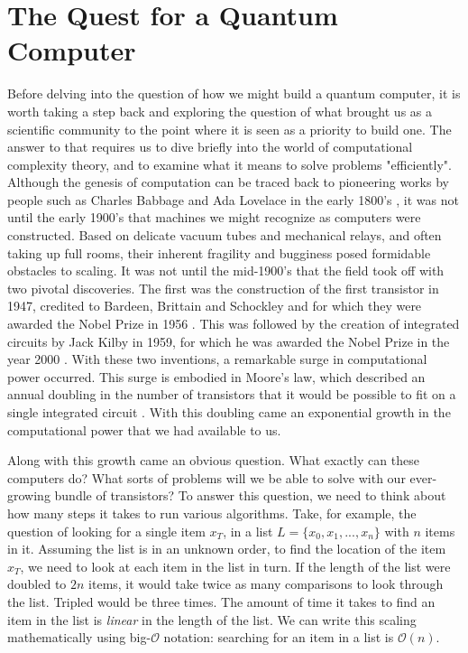 \chapter{The Quest for a Quantum Computer}
\label{sec:quest}
Before delving into the question of how we might build a quantum computer, it is worth taking a step
back and exploring the question of what brought us as a scientific community to the point where
it is seen as a priority to build one. The answer to that requires us to dive briefly into
the world of computational complexity theory, and to examine what it means to solve problems "efficiently".
Although the genesis of computation can be traced back to pioneering works by people such as Charles Babbage
and Ada Lovelace in the early 1800's \cite{Bowden:1953:FTS:1102044}, it was not until the early 1900's that
machines we might recognize as computers were constructed. Based on delicate vacuum tubes and mechanical relays,
and often taking up full rooms, their inherent fragility and bugginess posed formidable obstacles to scaling.
It was not until the mid-1900's that the field took off with two pivotal discoveries. The first
was the construction of the first transistor in 1947, credited to Bardeen, Brittain and Schockley and for which
they were awarded the Nobel Prize in 1956 \cite{nobel1956}. This was followed by the creation of integrated circuits by Jack Kilby
in 1959, for which he was awarded the Nobel Prize in the year 2000 \cite{nobel2000}. With these two inventions, a remarkable
surge in computational power occurred. This surge is embodied in Moore's law, which described an annual
doubling in the number of transistors that it would be possible to fit on a single integrated circuit \cite{4785860}.
With this doubling came an exponential growth in the computational power that we had available to us.

Along with this growth came an obvious question. What exactly can these computers do? What sorts of
problems will we be able to solve with our ever-growing bundle of transistors? To answer this question, we need to
think about how many steps it takes to run various algorithms. Take, for example, the question of looking
for a single item $x_T$, in a list $L = \{x_0, x_1, ..., x_n\}$ with $n$ items in it. Assuming the list
is in an unknown order, to find the location of the item $x_T$, we need to look at each item in the list
in turn. If the length of the list were doubled to $2n$ items, it would take twice as many comparisons to
look through the list. Tripled would be three times. The amount of time it takes to find an item in the
list is \emph{linear} in the length of the list. We can write this scaling mathematically using big-$\mathcal{O}$
notation: searching for an item in a list is $\mathcal{O}(n)$.

